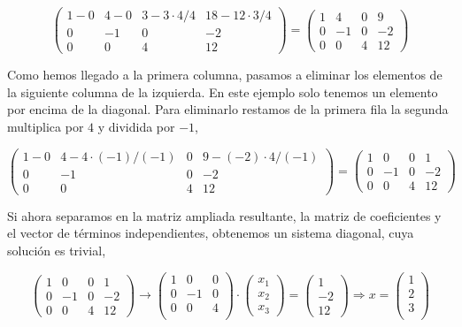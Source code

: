 \begin{equation*}
\begin{pmatrix}
1-0&     4-0&     3-3\cdot 4/4&    18-12\cdot 3/4\\
 0&    -1&    0&    -2\\
 0&     0&     4&    12
\end{pmatrix}=\begin{pmatrix}
1&     4&     0&    9\\
 0&    -1&    0&    -2\\
 0&     0&     4&    12
\end{pmatrix}
\end{equation*}

Como hemos llegado a la primera columna, pasamos a eliminar los elementos de la siguiente columna de la izquierda. En este ejemplo solo tenemos un elemento por encima de la diagonal. Para eliminarlo restamos de la primera fila la segunda multiplica por $4$ y dividida por $-1$,

\begin{equation*}
\begin{pmatrix}
1-0&     4-4\cdot(-1)/(-1)&     0&    9-(-2)\cdot4/(-1)\\
 0&    -1&    0&    -2\\
 0&     0&     4&    12
\end{pmatrix}=\begin{pmatrix}
1&     0&     0&    1\\
 0&    -1&    0&    -2\\
 0&     0&     4&    12
\end{pmatrix}
\end{equation*}

Si ahora separamos en la matriz ampliada resultante, la matriz de coeficientes y el vector de términos independientes, obtenemos un sistema diagonal, cuya solución es trivial,

\begin{equation*}
\begin{pmatrix}
1&     0&     0&    1\\
 0&    -1&    0&    -2\\
 0&     0&     4&    12
\end{pmatrix} \rightarrow \begin{pmatrix}
1&     0&     0\\
 0&    -1&    0\\
 0&     0&     4\\
\end{pmatrix}\cdot\begin{pmatrix}
x_1\\
x_2\\
x_3
\end{pmatrix}=\begin{pmatrix}
1\\
-2\\
12
\end{pmatrix} \Rightarrow x=\begin{pmatrix}
1\\
2\\
3\\
\end{pmatrix}
\end{equation*}

